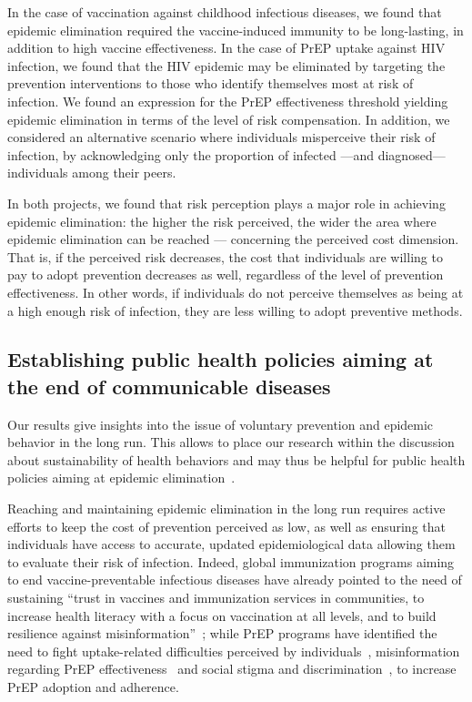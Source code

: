 In the case of vaccination against childhood infectious diseases, we found that epidemic elimination required the vaccine-induced immunity to be long-lasting, in addition to high vaccine effectiveness. In the case of PrEP uptake against HIV infection, we found that the HIV epidemic may be eliminated by targeting the prevention interventions to those who identify themselves most at risk of infection. We found an expression for the PrEP effectiveness threshold yielding epidemic elimination in terms of the level of risk compensation. In addition, we considered an alternative scenario where individuals misperceive their risk of infection, by acknowledging only the proportion of infected ---and diagnosed--- individuals among their peers. %

In both projects, we found that risk perception plays a major role in achieving epidemic elimination: the higher the risk perceived, the wider the area where epidemic elimination can be reached --- concerning the perceived cost dimension. That is, if the perceived risk decreases, the cost that individuals are willing to pay to adopt prevention decreases as well, regardless of the level of prevention effectiveness. In other words, if individuals do not perceive themselves as being at a high enough risk of infection, they are less willing to adopt preventive methods. 

\subsection{Establishing public health policies aiming at the end of communicable diseases}

Our results give insights into the issue of voluntary prevention and epidemic behavior in the long run. This allows to place our research within the discussion about sustainability of health behaviors and may thus be helpful for public health policies aiming at epidemic elimination~\cite[]{SDG_Goal3}.  

Reaching and maintaining epidemic elimination in the long run requires active efforts to keep the cost of prevention perceived as low, as well as ensuring that individuals have access to accurate, updated epidemiological data allowing them to evaluate their risk of infection. Indeed, global immunization programs aiming to end vaccine-preventable infectious diseases have already pointed to the need of sustaining ``trust in vaccines and immunization services in communities, to increase health literacy with a focus on vaccination at all levels, and to build resilience against misinformation''~\cite[]{WHO_IA2030}; while PrEP programs have identified the need to fight uptake-related difficulties perceived by individuals~\cite[]{Desai2018,Sidebottom2018}, misinformation regarding PrEP effectiveness~\cite[]{Young2014,Underhill2016} and social stigma and discrimination~\cite[]{Young2014,PerezFigueroa2015,Arnold2016}, to increase PrEP adoption and adherence.

